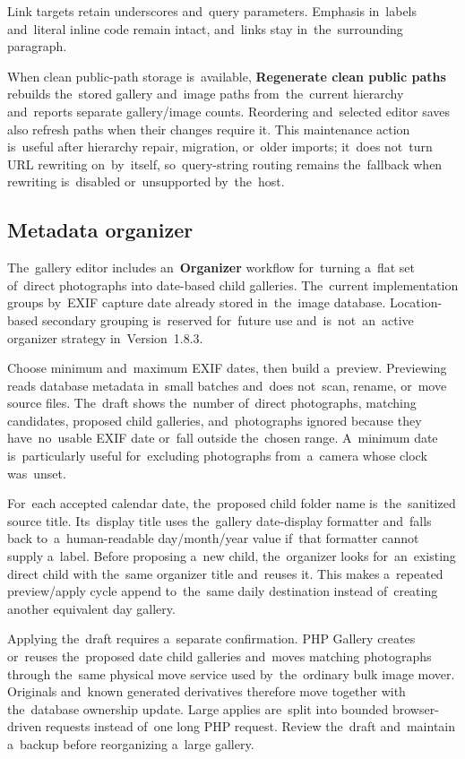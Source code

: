 \documentclass[11pt,a4paper]{article}
\newcommand{\version}{1.8.3}
\newcommand{\ui}[1]{\textbf{#1}}
\begin{document}
Link targets retain underscores and~query parameters. Emphasis in~labels
and~literal inline code remain intact, and~links stay in~the~surrounding
paragraph.

When clean public-path storage is~available, \ui{Regenerate clean public paths}
rebuilds the~stored gallery and~image paths from~the~current hierarchy
and~reports separate gallery/image counts. Reordering and~selected editor saves
also refresh paths when their changes require it. This maintenance action
is~useful after hierarchy repair, migration, or~older imports; it~does not~turn
URL rewriting on~by~itself, so~query-string routing remains the~fallback when
rewriting is~disabled or~unsupported by~the~host.

\subsection{Metadata organizer}

The~gallery editor includes an~\ui{Organizer} workflow for~turning a~flat set
of~direct photographs into date-based child galleries. The~current
implementation groups by~EXIF capture date already stored in~the~image database.
Location-based secondary grouping is~reserved for~future use
and~is~not~an~active organizer strategy in~Version~\version{}.

Choose minimum and~maximum EXIF dates, then build a~preview. Previewing reads
database metadata in~small batches and~does not~scan, rename, or~move source
files. The~draft shows the~number of~direct photographs, matching candidates,
proposed child galleries, and~photographs ignored because they have~no~usable
EXIF date or~fall outside the~chosen range. A~minimum date is~particularly
useful for~excluding photographs from~a~camera whose clock was~unset.

For~each accepted calendar date, the~proposed child folder name is~the~sanitized
source title. Its~display title uses the~gallery date-display formatter
and~falls back to~a~human-readable day/month/year value if~that formatter cannot
supply a~label. Before proposing a~new child, the~organizer looks
for~an~existing direct child with the~same organizer title and~reuses it. This
makes a~repeated preview/apply cycle append to~the~same daily destination
instead of~creating another equivalent day gallery.

Applying the~draft requires a~separate confirmation. PHP Gallery creates
or~reuses the~proposed date child galleries and~moves matching photographs
through the~same physical move service used by~the~ordinary bulk image mover.
Originals and~known generated derivatives therefore move together with
the~database ownership update. Large applies are~split into bounded
browser-driven requests instead of~one long PHP request. Review the~draft
and~maintain a~backup before reorganizing a~large gallery.
\end{document}
